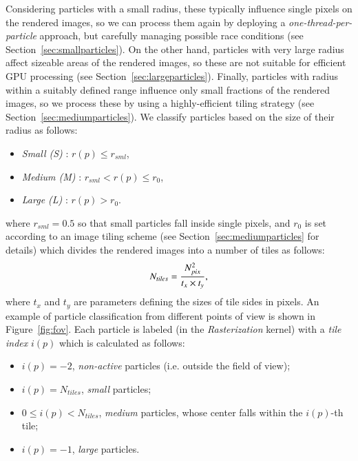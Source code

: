 \documentclass[1p]{elsarticle}
\begin{document}
Considering particles with a small radius, these typically influence single pixels on the rendered images, so we can process them again by deploying a {\it one-thread-per-particle} approach, but carefully managing possible race conditions (see Section~\ref{sec:smallparticles}). On the other hand, particles with very large radius affect sizeable areas of the rendered images, so these are not suitable for efficient GPU processing (see Section~\ref{sec:largeparticles}). Finally, particles with radius within a suitably defined range influence only small fractions of the rendered images, so we process these by using a highly-efficient tiling strategy (see Section~\ref{sec:mediumparticles}). We classify particles based on the size of their radius as follows:

\begin{itemize}
\item
{\it Small (S)} : $r(p) \le r_{sml}$,
\item
{\it Medium (M)} : $r_{sml} < r(p) \le r_0$,
\item
{\it Large (L)} : $r(p) > r_0$.
\end{itemize}
where $r_{sml} = 0.5$ so that small particles fall inside single pixels, and 
$r_0$ is set according to an image tiling scheme (see Section~\ref{sec:mediumparticles} for details) which divides the rendered images
into a number of tiles as follows:  
\begin{equation}\label{tiles}
N_{tiles} = {N_{pix}^2\over t_x \times t_y},
\end{equation}
where $t_x$ and $t_y$ are parameters defining the sizes of tile sides in pixels.
An example of particle classification from different points of view is shown in Figure~\ref{fig:fov}. Each particle is labeled (in the {\it Rasterization} kernel) with a {\it tile index} $i(p)$ which is calculated as follows:
\begin{itemize}
\item
$i(p) = -2$, {\it non-active} particles (i.e. outside the field of view);
\item
$i(p) = N_{tiles}$, {\it small} particles;
\item
$0 \le i(p) < N_{tiles}$, {\it medium} particles, whose center falls within the $i(p)$-th tile;
\item
$i(p) = -1$, {\it large} particles.
\end{itemize}
\end{document}
